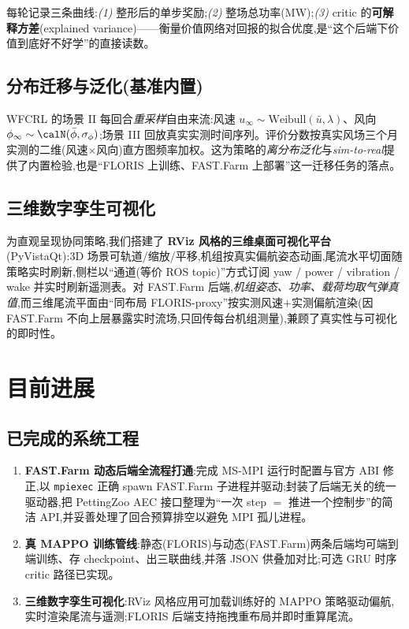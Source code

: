 \documentclass[12pt,a4paper]{article}
\theoremstyle{definition}
\theoremstyle{plain}
\newcommand{\wind}{u_{\infty}}
\newcommand{\dir}{\phi_{\infty}}
\begin{document}
每轮记录三条曲线:\emph{(1)} 整形后的单步奖励;\emph{(2)} 整场总功率(MW);\emph{(3)} critic 的\textbf{可解释方差}(explained variance)——衡量价值网络对回报的拟合优度,是“这个后端下价值到底好不好学”的直接读数。

\subsection{分布迁移与泛化(基准内置)}

WFCRL 的场景 II 每回合\emph{重采样}自由来流:风速 $\wind\sim\text{Weibull}(\bar u,\lambda)$、风向 $\dir\sim\calN(\bar\phi,\sigma_\phi)$;场景 III 回放真实实测时间序列。评价分数按真实风场三个月实测的二维(风速$\times$风向)直方图频率加权。这为策略的\emph{离分布泛化}与\emph{sim-to-real}提供了内置检验,也是“FLORIS 上训练、FAST.Farm 上部署”这一迁移任务的落点。

\subsection{三维数字孪生可视化}

为直观呈现协同策略,我们搭建了 \textbf{RViz 风格的三维桌面可视化平台}(PyVistaQt):3D 场景可轨道/缩放/平移,机组按真实偏航姿态动画,尾流水平切面随策略实时刷新,侧栏以“通道(等价 ROS topic)”方式订阅 yaw / power / vibration / wake 并实时刷新遥测表。对 FAST.Farm 后端,\emph{机组姿态、功率、载荷均取气弹真值},而三维尾流平面由“同布局 FLORIS-proxy”按实测风速$+$实测偏航渲染(因 FAST.Farm 不向上层暴露实时流场,只回传每台机组测量),兼顾了真实性与可视化的即时性。

\section{目前进展}
\label{sec:progress}

\subsection{已完成的系统工程}

\begin{enumerate}[leftmargin=1.6em,itemsep=2pt]
  \item \textbf{FAST.Farm 动态后端全流程打通}:完成 MS-MPI 运行时配置与官方 ABI 修正,以 \texttt{mpiexec} 正确 spawn FAST.Farm 子进程并驱动;封装了后端无关的统一驱动器,把 PettingZoo AEC 接口整理为“一次 step $=$ 推进一个控制步”的简洁 API,并妥善处理了回合预算排空以避免 MPI 孤儿进程。
  \item \textbf{真 MAPPO 训练管线}:静态(FLORIS)与动态(FAST.Farm)两条后端均可端到端训练、存 checkpoint、出三联曲线,并落 JSON 供叠加对比;可选 GRU 时序 critic 路径已实现。
  \item \textbf{三维数字孪生可视化}:RViz 风格应用可加载训练好的 MAPPO 策略驱动偏航,实时渲染尾流与遥测;FLORIS 后端支持拖拽重布局并即时重算尾流。
\end{enumerate}
\end{document}
